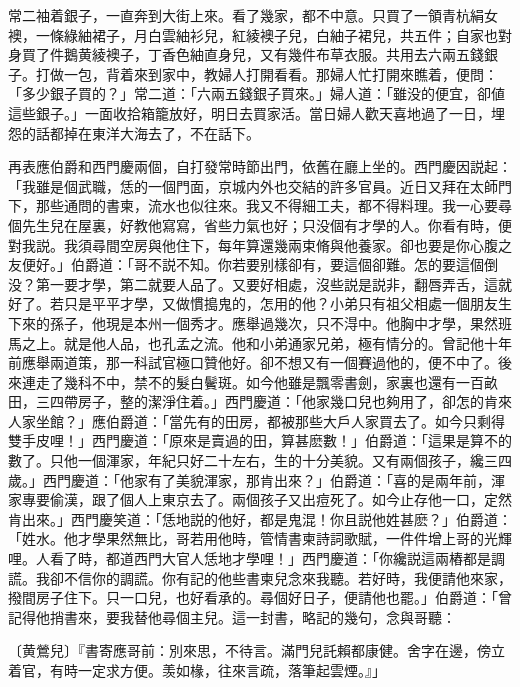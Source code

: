 常二袖着銀子，一直奔到大街上來。看了幾家，都不中意。只買了一領青杭絹女襖，一條綠紬裙子，月白雲紬衫兒，紅綾襖子兒，白紬子裙兒，共五件；自家也對身買了件鵝黄綾襖子，丁香色紬直身兒，又有幾件布草衣服。共用去六兩五錢銀子。打做一包，背着來到家中，教婦人打開看看。那婦人忙打開來瞧着，便問：「多少銀子買的？」常二道：「六兩五錢銀子買來。」婦人道：「雖没的便宜，卻値這些銀子。」一面收拾箱籠放好，明日去買家活。當日婦人歡天喜地過了一日，埋怨的話都掉在東洋大海去了，不在話下。

再表應伯爵和西門慶兩個，自打發常時節出門，依舊在廳上坐的。西門慶因説起：「我雖是個武職，恁的一個門面，京城内外也交結的許多官員。近日又拜在太師門下，那些通問的書柬，流水也似往來。我又不得細工夫，都不得料理。我一心要尋個先生兒在屋裏，好教他寫寫，省些力氣也好；只没個有才學的人。你看有時，便對我説。我須尋間空房與他住下，每年算還幾兩束脩與他養家。卻也要是你心腹之友便好。」伯爵道：「哥不説不知。你若要别樣卻有，要這個卻難。怎的要這個倒没？第一要才學，第二就要人品了。又要好相處，沒些説是説非，翻唇弄舌，這就好了。若只是平平才學，又做慣搗鬼的，怎用的他？小弟只有祖父相處一個朋友生下來的孫子，他現是本州一個秀才。應舉過幾次，只不淂中。他胸中才學，果然班馬之上。就是他人品，也孔孟之流。他和小弟通家兄弟，極有情分的。曾記他十年前應舉兩道策，那一科試官極口贊他好。卻不想又有一個賽過他的，便不中了。後來連走了幾科不中，禁不的髮白鬢斑。如今他雖是飄零書劍，家裏也還有一百畝田，三四帶房子，整的潔淨住着。」西門慶道：「他家幾口兒也夠用了，卻怎的肯來人家坐館？」應伯爵道：「當先有的田房，都被那些大戶人家買去了。如今只剩得雙手皮哩！」西門慶道：「原來是賣過的田，算甚麽數！」伯爵道：「這果是算不的數了。只他一個渾家，年紀只好二十左右，生的十分美貌。又有兩個孩子，纔三四歲。」西門慶道：「他家有了美貌渾家，那肯出來？」伯爵道：「喜的是兩年前，渾家專要偷漢，跟了個人上東京去了。兩個孩子又出痘死了。如今止存他一口，定然肯出來。」西門慶笑道：「恁地説的他好，都是鬼混！你且説他姓甚麽？」伯爵道：「姓水。他才學果然無比，哥若用他時，管情書柬詩詞歌賦，一件件增上哥的光輝哩。人看了時，都道西門大官人恁地才學哩！」西門慶道：「你纔説這兩樁都是調謊。我卻不信你的調謊。你有記的他些書柬兒念來我聽。若好時，我便請他來家，撥間房子住下。只一口兒，也好看承的。尋個好日子，便請他也罷。」伯爵道：「曾記得他捎書來，要我替他尋個主兒。這一封書，略記的幾句，念與哥聽：

\begin{myquote}
{\marktext〔黄鶯兒〕}『書寄應哥前：別來思，不待言。滿門兒託賴都康健。舍字在邊，傍立着官，有時一定求方便。羡如椽，往來言疏，落筆起雲煙。』」
\end{myquote}

